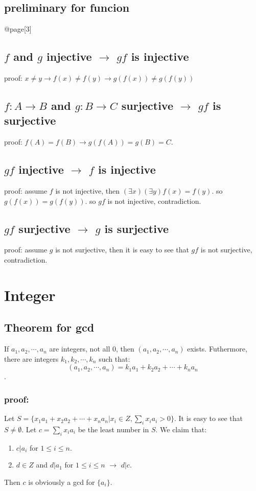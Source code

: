 \documentclass[11pt]{article}
\begin{document}
\subsection{preliminary for funcion}
\label{sec:org5253571}
@page[3]
\subsection{\(f\) and \(g\) injective \(\to\) \(gf\) is injective}
\label{sec:orgd9a5102}
proof: \(x\not=y \to f(x)\not=f(y) \to g(f(x))\not= g(f(y))\)
\subsection{\(f:A\to B\) and \(g:B\to C\) surjective \(\to\) \(gf\) is surjective}
\label{sec:org3a45c18}
proof: \(f(A) = f(B) \to g(f(A)) = g(B) = C\).
\subsection{\(gf\) injective \(\to\) \(f\) is injective}
\label{sec:orgc995b44}
proof: assume \(f\) is not injective, then \((\exists x)(\exists y) f(x) = f(y)\).
so \(g(f(x)) = g(f(y))\). so \(gf\) is not injective, contradiction.
\subsection{\(gf\) surjective \(\to\) \(g\) is surjective}
\label{sec:orga076024}
proof: assume \(g\) is not surjective, then it is easy to see
that \(gf\) is not surjective, contradiction.
\section{Integer}
\label{sec:org4f9c461}
\subsection{Theorem for gcd}
\label{sec:orgdf6d6ac}
If \(a_1, a_2, \cdots, a_n\) are integers, not all \(0\), then \((a_1, a_2, \cdots, a_n)\) exists.
Futhermore, there are integers \(k_1, k_2, \cdots, k_n\) such that:
\[(a_1, a_2, \cdots, a_n) = k_1a_1 + k_2a_2 + \cdots + k_na_n\].
\subsubsection{proof:}
\label{sec:org3edd32a}
Let \(S = \{x_1a_1 + x_2a_2 + \cdots + x_na_n | x_i\in Z, \sum_{i}x_ia_i > 0\}\).
It is easy to see that \(S\not=\emptyset\).
Let \(c = \sum_{i} x_ia_i\) be the least number in \(S\).
We claim that:
\begin{enumerate}
\item \(c | a_i\) for \(1 \leq i \leq n\).
\item \(d\in Z\) and \(d|a_1\) for \(1\leq i\leq n\) \(\to\) \(d|c\).
\end{enumerate}
Then \(c\) is obviously a gcd for \(\{a_i\}\).
\end{document}
